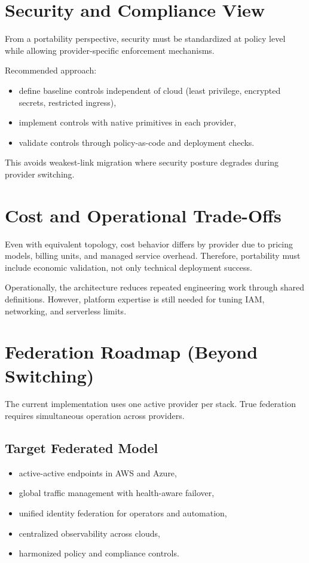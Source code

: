 \documentclass[conference]{IEEEtran}
\begin{document}
\section{Security and Compliance View}
From a portability perspective, security must be standardized at policy level while allowing provider-specific enforcement mechanisms.

Recommended approach:
\begin{itemize}
    \item define baseline controls independent of cloud (least privilege, encrypted secrets, restricted ingress),
    \item implement controls with native primitives in each provider,
    \item validate controls through policy-as-code and deployment checks.
\end{itemize}

This avoids weakest-link migration where security posture degrades during provider switching.

\section{Cost and Operational Trade-Offs}
Even with equivalent topology, cost behavior differs by provider due to pricing models, billing units, and managed service overhead. Therefore, portability must include economic validation, not only technical deployment success.

Operationally, the architecture reduces repeated engineering work through shared definitions. However, platform expertise is still needed for tuning IAM, networking, and serverless limits.

\section{Federation Roadmap (Beyond Switching)}
The current implementation uses one active provider per stack. True federation requires simultaneous operation across providers.

\subsection{Target Federated Model}
\begin{itemize}
    \item active-active endpoints in AWS and Azure,
    \item global traffic management with health-aware failover,
    \item unified identity federation for operators and automation,
    \item centralized observability across clouds,
    \item harmonized policy and compliance controls.
\end{itemize}
\end{document}
